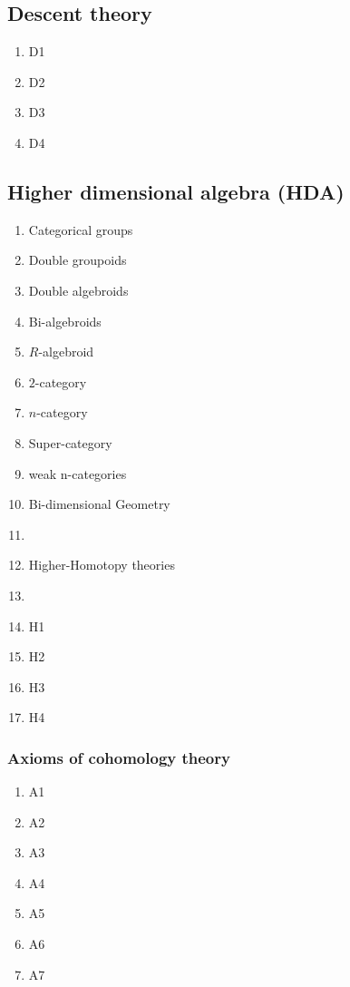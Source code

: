 \documentclass[12pt]{article}
\theoremstyle{plain}
\theoremstyle{definition}
\numberwithin{equation}{section}
\begin{document}
\subsection{Descent theory}
\begin{enumerate}
\item D1
\item D2
\item D3
\item D4

\end{enumerate}

\subsection{Higher dimensional algebra (HDA)}

\begin{enumerate}
\item Categorical groups 
\item Double groupoids
\item Double algebroids
\item Bi-algebroids
\item $R$-algebroid
\item $2$-category
\item $n$-category
\item Super-category
\item weak n-categories
\item Bi-dimensional Geometry
\item {}
\item Higher-Homotopy theories
\item {}
\item H1
\item H2
\item H3
\item H4

\end{enumerate}



\subsubsection{Axioms of cohomology theory}
\begin{enumerate}

\item A1
\item A2
\item A3
\item A4
\item A5
\item A6
\item A7

\end{enumerate}
\end{document}

